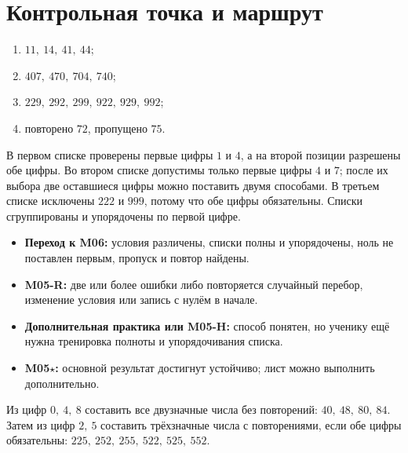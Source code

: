 \newpage
\newpage
\section{Контрольная точка и маршрут}

\begin{teacherbox}[Ответы]
  \begin{enumerate}
    \item \(11,\ 14,\ 41,\ 44\);
    \item \(407,\ 470,\ 704,\ 740\);
    \item \(229,\ 292,\ 299,\ 922,\ 929,\ 992\);
    \item повторено \(72\), пропущено \(75\).
  \end{enumerate}
\end{teacherbox}

\begin{teacherbox}
  В первом списке проверены первые цифры \(1\) и \(4\), а на второй позиции
  разрешены обе цифры. Во втором списке допустимы только первые цифры \(4\) и
  \(7\); после их выбора две оставшиеся цифры можно поставить двумя способами.
  В третьем списке исключены \(222\) и \(999\), потому что обе цифры
  обязательны. Списки сгруппированы и упорядочены по первой цифре.
\end{teacherbox}

\begin{resultbox}
  \begin{itemize}
    \item \textbf{Переход к M06:} условия различены, списки полны и
      упорядочены, ноль не поставлен первым, пропуск и повтор найдены.
    \item \textbf{M05-R:} две или более ошибки либо повторяется случайный
      перебор, изменение условия или запись с нулём в начале.
    \item \textbf{Дополнительная практика или M05-H:} способ понятен, но
      ученику ещё нужна тренировка полноты и упорядочивания списка.
    \item \textbf{M05\(\star\):} основной результат достигнут устойчиво;
      лист можно выполнить дополнительно.
  \end{itemize}
\end{resultbox}

\begin{teacherbox}
  Из цифр \(0,\ 4,\ 8\) составить все двузначные числа без повторений:
  \(40,\ 48,\ 80,\ 84\). Затем из цифр \(2,\ 5\) составить трёхзначные числа
  с повторениями, если обе цифры обязательны:
  \(225,\ 252,\ 255,\ 522,\ 525,\ 552\).
\end{teacherbox}


